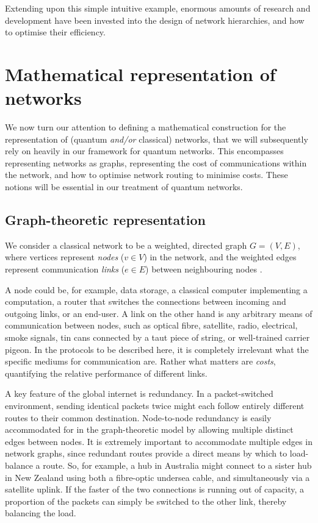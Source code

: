 \documentclass[aps,rmp,twocolumn,amsmath,amssymb,nofootinbib,superscriptaddress]{revtex4}
\newcommand{\comment}[1]{{\color{blue}{\textbf{#1}}}}
\begin{document}
Extending upon this simple intuitive example, enormous amounts of research and development have been invested into the design of network hierarchies, and how to optimise their efficiency.

\comment{To do}

%
%

\section{Mathematical representation of networks}

We now turn our attention to defining a mathematical construction for the representation of (quantum \emph{and/or} classical) networks, that we will subsequently rely on heavily in our framework for quantum networks. This encompasses representing networks as graphs, representing the cost of communications within the network, and how to optimise network routing to minimise costs.  These notions will be essential in our treatment of quantum networks.

%
%

\subsection{Graph-theoretic representation}

We consider a classical network to be a weighted, directed graph \mbox{$G=(V,E)$}, where vertices represent \emph{nodes} (\mbox{$v\in V$}) in the network, and the weighted edges represent communication \emph{links} (\mbox{$e\in E$}) between neighbouring nodes \cite{???}.

A node could be, for example, data storage, a classical computer implementing a computation, a router that switches the connections between incoming and outgoing links, or an end-user. A link on the other hand is any arbitrary means of communication between nodes, such as optical fibre, satellite, radio, electrical, smoke signals, tin cans connected by a taut piece of string, or well-trained carrier pigeon. In the protocols to be described here, it is completely irrelevant what the specific mediums for communication are. Rather what matters are \emph{costs}, quantifying the relative performance of different links.

A key feature of the global internet is redundancy. In a packet-switched \cite{???} environment, sending identical packets twice might each follow entirely different routes to their common destination. Node-to-node redundancy is easily accommodated for in the graph-theoretic model by allowing multiple distinct edges between nodes. It is extremely important to accommodate multiple edges in network graphs, since redundant routes provide a direct means by which to load-balance a route. So, for example, a hub in Australia might connect to a sister hub in New Zealand using both a fibre-optic undersea cable, and simultaneously via a satellite uplink. If the faster of the two connections is running out of capacity, a proportion of the packets can simply be switched to the other link, thereby balancing the load.
\end{document}
